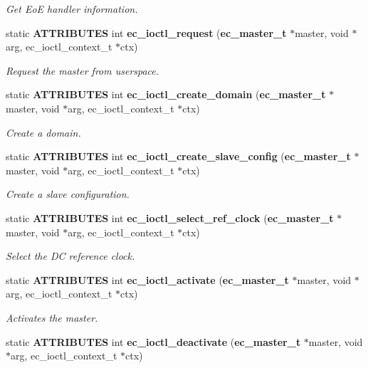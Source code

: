 \begin{DoxyCompactItemize}
\begin{DoxyCompactList}\small\item\em Get Eo\-E handler information. \end{DoxyCompactList}\item 
static {\bf A\-T\-T\-R\-I\-B\-U\-T\-E\-S} int {\bf ec\-\_\-ioctl\-\_\-request} ({\bf ec\-\_\-master\-\_\-t} $\ast$master, void $\ast$arg, ec\-\_\-ioctl\-\_\-context\-\_\-t $\ast$ctx)
\begin{DoxyCompactList}\small\item\em Request the master from userspace. \end{DoxyCompactList}\item 
static {\bf A\-T\-T\-R\-I\-B\-U\-T\-E\-S} int {\bf ec\-\_\-ioctl\-\_\-create\-\_\-domain} ({\bf ec\-\_\-master\-\_\-t} $\ast$master, void $\ast$arg, ec\-\_\-ioctl\-\_\-context\-\_\-t $\ast$ctx)
\begin{DoxyCompactList}\small\item\em Create a domain. \end{DoxyCompactList}\item 
static {\bf A\-T\-T\-R\-I\-B\-U\-T\-E\-S} int {\bf ec\-\_\-ioctl\-\_\-create\-\_\-slave\-\_\-config} ({\bf ec\-\_\-master\-\_\-t} $\ast$master, void $\ast$arg, ec\-\_\-ioctl\-\_\-context\-\_\-t $\ast$ctx)
\begin{DoxyCompactList}\small\item\em Create a slave configuration. \end{DoxyCompactList}\item 
static {\bf A\-T\-T\-R\-I\-B\-U\-T\-E\-S} int {\bf ec\-\_\-ioctl\-\_\-select\-\_\-ref\-\_\-clock} ({\bf ec\-\_\-master\-\_\-t} $\ast$master, void $\ast$arg, ec\-\_\-ioctl\-\_\-context\-\_\-t $\ast$ctx)
\begin{DoxyCompactList}\small\item\em Select the D\-C reference clock. \end{DoxyCompactList}\item 
static {\bf A\-T\-T\-R\-I\-B\-U\-T\-E\-S} int {\bf ec\-\_\-ioctl\-\_\-activate} ({\bf ec\-\_\-master\-\_\-t} $\ast$master, void $\ast$arg, ec\-\_\-ioctl\-\_\-context\-\_\-t $\ast$ctx)
\begin{DoxyCompactList}\small\item\em Activates the master. \end{DoxyCompactList}\item 
static {\bf A\-T\-T\-R\-I\-B\-U\-T\-E\-S} int {\bf ec\-\_\-ioctl\-\_\-deactivate} ({\bf ec\-\_\-master\-\_\-t} $\ast$master, void $\ast$arg, ec\-\_\-ioctl\-\_\-context\-\_\-t $\ast$ctx)

\end{DoxyCompactItemize}

